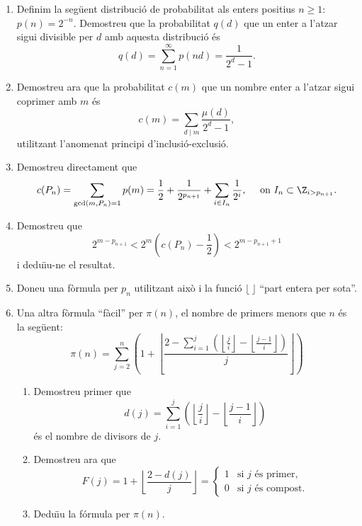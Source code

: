 \begin{enumerate}[leftmargin=*]
\begin{enumerate}
\item Definim la seg\"{u}ent distribució de probabilitat als enters positius
$n\ge 1$: $p(n)=2^{-n}$. Demostreu que la probabilitat $q(d)$ que un
enter a l'atzar sigui divisible per $d$ amb aquesta distribució és
$$q(d)=\sum_{n=1}^{\infty} p(nd)=\frac{1}{2^d-1}.$$
\item Demostreu ara que la probabilitat $c(m)$ que un nombre enter a
l'atzar sigui coprimer amb $m$ és
$$c(m)=\sum_{d\mid m} \frac{\mu(d)}{2^d-1},$$
utilitzant l'anomenat principi d'inclusió-exclusió.
\item Demostreu directament que
\[c(P_n)=\sum_{\gcd(m,P_n)=1} p(m)= \frac 12 + \frac{1}{2^{p_{n+1}}} +
\sum_{i\in I_n}\frac{1}{2^i},\quad\text{ on  } I_n\subset \Z_{i>p_{n+1}}.\]
\item Demostreu que $$2^{m-p_{n+1}}<2^{m}\left(c(P_n)-\frac12\right) <2^{m-p_{n+1}+1}$$
i dedu\"{\i}u-ne el resultat.
\item Doneu una fòrmula per $p_n$ utilitzant això i la funció $\lfloor\
\rfloor$ ``part entera per sota''.
\item Una altra fòrmula ``fàcil'' per $\pi(n)$, el nombre de primers
menors que $n$ és la seg\"{u}ent:
$$ \pi(n)=\sum_{j=2}^n \left( 1 + \left\lfloor
\frac{2-\sum_{i=1}^j \left( \left\lfloor\frac
{j}{i}\right\rfloor-\left\lfloor\frac {j-1}{i}\right\rfloor\right)}
{j} \right\rfloor \right)$$
\begin{enumerate}
\item Demostreu primer que
$$d(j)=\sum_{i=1}^j \left( \left\lfloor\frac
{j}{i}\right\rfloor-\left\lfloor\frac {j-1}{i}\right\rfloor\right)$$
és el nombre de divisors de $j$.
\item Demostreu ara que
\[F(j)= 1 + \left\lfloor
\frac{2-d(j)} {j} \right\rfloor =
\begin{cases}
1 & \text{si $j$ és primer},\\
0 & \text{si $j$ és compost}.
\end{cases}
\]
\item Dedu\"{\i}u la fórmula per $\pi(n)$.
\end{enumerate}

\end{enumerate}



\end{enumerate}
